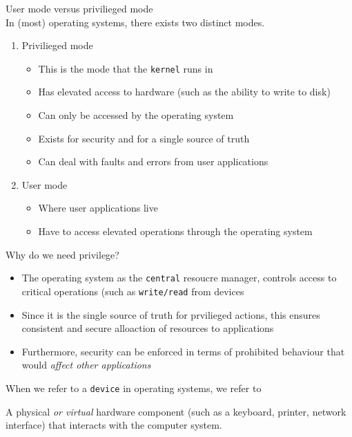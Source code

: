 \documentclass[journal, letterpaper]{IEEEtran}
\begin{document}
\begin{aside}{User mode versus privilieged mode} \\ 
    In (most) operating systems, there exists two distinct modes.
    \begin{enumerate}
        \item Privilieged mode
        \begin{itemize}
            \item This is the mode that the \verb|kernel| runs in
            \item Has elevated access to hardware (such as the ability to write to disk)
            \item Can only be accessed by the operating system
            \item Exists for security and for a single source of truth
            \item Can deal with faults and errors from user applications
        \end{itemize}
        \item User mode
        \begin{itemize}
            \item Where user applications live
            \item Have to access elevated operations through the operating system
        \end{itemize}
    \end{enumerate}
\end{aside}
\begin{example}{Why do we need privilege?}
    \begin{itemize}
        \item The operating system as the \verb|central| resoucre manager, controls access to critical operations (such as \verb|write/read| from devices
        \item Since it is the single source of truth for prvilieged actions, this ensures consistent and secure alloaction of resources to applications
        \item Furthermore, security can be enforced in terms of prohibited behaviour that would \textit{affect other applications}
    \end{itemize}
\end{example}
When we refer to a \verb|device| in operating systems, we refer to
\begin{center}
    A physical \textit{or virtual} hardware component (such as a keyboard, printer, network interface) that interacts with the computer system.
\end{center}
\end{document}
